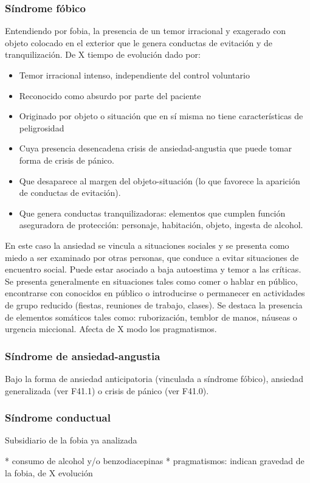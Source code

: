 \documentclass{scrbook}
\begin{document}
\subsubsection*{Síndrome fóbico}
Entendiendo por fobia, la presencia de un temor irracional y exagerado con objeto colocado en el exterior que le genera conductas de evitación y de tranquilización. De X tiempo de evolución dado por:
\begin{itemize}
	\item Temor irracional intenso, independiente del control voluntario
	\item Reconocido como absurdo por parte del paciente
	\item Originado por objeto o situación que en sí misma no tiene características de peligrosidad
	\item Cuya presencia desencadena crisis de ansiedad-angustia que puede tomar forma de crisis de pánico.
	\item Que desaparece al margen del objeto-situación (lo que favorece la aparición de conductas de evitación).
	\item Que genera conductas tranquilizadoras: elementos que cumplen función aseguradora de protección: personaje, habitación, objeto, ingesta de alcohol.
\end{itemize}
En este caso la ansiedad se vincula a situaciones sociales y se presenta como miedo a ser examinado por otras personas, que conduce a evitar situaciones de encuentro social. Puede estar asociado a baja autoestima y temor a las críticas. Se presenta generalmente en situaciones tales como comer o hablar en público, encontrarse con conocidos en público o introducirse o permanecer en actividades de grupo reducido (fiestas, reuniones de trabajo, clases). Se destaca la presencia de elementos somáticos tales como: ruborización, temblor de manos, náuseas o urgencia miccional. Afecta de X modo los pragmatismos.
\subsubsection*{Síndrome de ansiedad-angustia}
Bajo la forma de ansiedad anticipatoria (vinculada a síndrome fóbico), ansiedad generalizada (ver F41.1) o crisis de pánico (ver F41.0).
\subsubsection*{Síndrome conductual}
Subsidiario de la fobia ya analizada

* consumo de alcohol y/o benzodiacepinas
* pragmatismos: indican gravedad de la fobia, de X evolución
\end{document}
